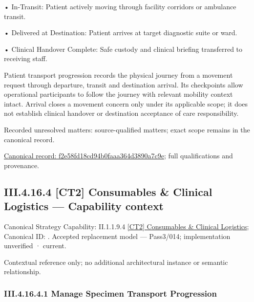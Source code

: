 •
In-Transit: Patient actively moving through facility corridors or ambulance transit.



•
Delivered at Destination: Patient arrives at target diagnostic suite or ward.



•
Clinical Handover Complete: Safe custody and clinical briefing transferred to receiving staff.



Patient transport progression records the physical journey from a movement request through departure, transit and destination arrival. Its checkpoints allow operational participants to follow the journey with relevant mobility context intact. Arrival closes a movement concern only under its applicable scope; it does not establish clinical handover or destination acceptance of care responsibility.


{\small Recorded unresolved matters: source-qualified matters; exact scope remains in the canonical record.}\par
{\footnotesize \href{../../../../../../../../continuum/business/business-process/f2e58fd18cd94b0faaa364d3890a7c9e.md}{Canonical record: f2e58fd18cd94b0faaa364d3890a7c9e}; full qualifications and provenance.}\par
\subsection*{III.4.16.4 [CT2] Consumables \& Clinical Logistics — Capability context}
\label{navigation:III.4.16.4}

{\small Canonical Strategy Capability: II.1.1.9.4 \hyperref[element:00dae2e008c4499fa44e0b929c4e4a80]{[CT2] Consumables \& Clinical Logistics}; Canonical ID: \texttt{}. Accepted replacement model — Pass3/014; implementation unverified · current.}\par
Contextual reference only; no additional architectural instance or semantic relationship.\par
\subsubsection*{III.4.16.4.1 Manage Specimen Transport Progression}
\label{navigation:III.4.16.4.1}

